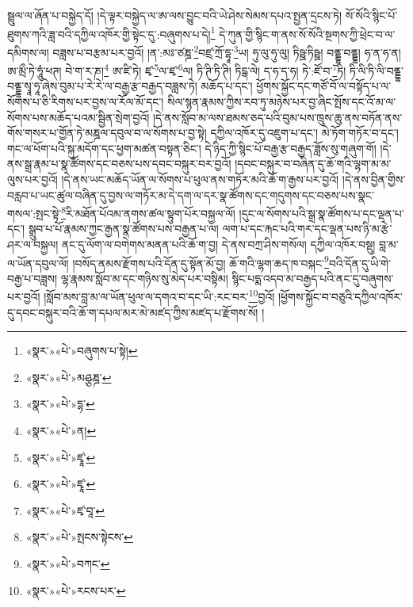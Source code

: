 སྦྲུལ་ལ་ཞོན་པ་བསྐྱེད་དོ། །དེ་ལྟར་བསྐྱེད་ལ་ཨ་ལས་བྱུང་བའི་ཡེ་ཤེས་སེམས་དཔའ་སྤྱན་དྲངས་ཏེ། སོ་སོའི་སྙིང་པོ་ཐུགས་ཀའི་ཟླ་བའི་དཀྱིལ་འཁོར་གྱི་སྟེང་དུ་:བཞུགས་པ་དེ།\footnote{«སྣར་»«པེ་»བཞུགས་པ་སྟེ།} དེ་ཀུན་གྱི་སྙིང་ག་ནས་སོ་སོའི་སྔགས་ཀྱི་ཕྲེང་བ་ལ་དམིགས་ལ། བཟླས་པ་བརྩམ་པར་བྱའོ། །ན་:མཿ་ཙཎྜ་\footnote{«སྣར་»«པེ་»མཤྩཎྜ་}བཛྲ་ཀྲོ་དྷཱ་\footnote{«སྣར་»«པེ་»དྷ་}ཡ། ཧུ་ལུ་ཧུ་ལུ། ཏིཥྛ་ཏིཥྛ། བནྡྷ་བནྡྷ། ཧ་ན་ཧ་ན། ཨ་མྲྀ་ཏེ་ཧཱུཾ་ཕཊ། བེ་ག་ར་ཎ།\footnote{«སྣར་»«པེ་»ན།} ཨ་ཛི་ཏེ། ཛྭ་\footnote{«སྣར་»«པེ་»ཛྭཱ་}ལ་ཛྭ་\footnote{«སྣར་»«པེ་»ཛྭཱ་}ལ། ཏི་ཊི་ཏི་ཊི། ཏིངྒ་ལེ། ད་ཧ་ད་ཧ། ཏེ་:ཛོ་བ་\footnote{«སྣར་»«པེ་»ཛྭ་བཱ་}ཏི། ཏི་ལི་ཏི་ལི་བནྡྷ་བནྡྷ་སྭཱ་ཧཱ་ཞེས་བུམ་པ་རེ་རེ་ལ་བརྒྱ་རྩ་བརྒྱད་བཟླས་ཏེ། མཆོད་པ་དང་། ཕྱོགས་སྐྱོང་དང་གཙོ་བོ་ལ་བསྟོད་པ་ལ་སོགས་པ་ཅི་རིགས་པར་བྱས་ལ་རོལ་མོ་དང་། སིལ་སྙན་རྣམས་ཀྱིས་རབ་ཏུ་མཉེས་པར་བྱ་ཞིང་སྤོས་དང་འོ་མ་ལ་སོགས་པས་མཆོད་པའམ་སྦྱིན་སྲེག་བྱའོ། །དེ་ནས་སློབ་མ་ལས་ཐམས་ཅད་པའི་བུམ་པས་ཁྲུས་ཆུ་ནས་བཏོན་ནས་གོས་གསར་པ་གྱོན་ཏེ་མཎྜལ་དབུལ་བ་ལ་སོགས་པ་བྱ་སྟེ། དཀྱིལ་འཁོར་དུ་འཇུག་པ་དང་། མེ་ཏོག་གཏོར་བ་དང་། གང་ལ་ཕོག་པའི་སྐུ་མདོག་དང་ཕྱག་མཚན་བསྟན་ཅིང་། དེ་ཉིད་ཀྱི་སྙིང་པོ་བརྒྱ་རྩ་བརྒྱད་ཟློས་སུ་གཞུག་གོ། །དེ་ནས་སྒྲ་རྣམ་པ་སྣ་ཚོགས་དང་བཅས་པས་དབང་བསྐུར་བར་བྱའོ། །དབང་བསྐུར་བ་བཞིན་དུ་ཆོ་གའི་ལྷག་མ་མ་ལུས་པར་བྱའོ། །དེ་ནས་ཡང་མཆོད་ཡོན་ལ་སོགས་པ་ཕུལ་ནས་གཏོར་མའི་ཆོ་ག་རྒྱས་པར་བྱའོ། །དེ་ནས་བྱིན་གྱིས་བརླབ་པ་ཡང་ཚུལ་བཞིན་དུ་བྱས་ལ་གཏོར་མ་དེ་དག་ལ་དར་སྣ་ཚོགས་དང་གདུགས་དང་བཅས་པས་སྣང་གསལ་:སྤང་སྟེ་\footnote{«སྣར་»«པེ་»སྤངས་སྟེངས་}རི་མཐོན་པོའམ་ནགས་ཚལ་སྟུག་པོར་བསྐྱལ་ལོ། །དུང་ལ་སོགས་པའི་སྒྲ་སྣ་ཚོགས་པ་དང་ལྡན་པ་དང་། སྒྲུབ་པ་པོ་རྣམས་ཀྱང་རྒྱན་སྣ་ཚོགས་པས་བརྒྱན་པ་ལ། ལག་པ་དང་རྐང་པའི་གར་དང་ལྡན་པས་ཉི་མ་རྩེ་ཤར་ལ་བསྐྱལ། ནང་དུ་ལོག་ལ་བགེགས་མནན་པའི་ཆོ་ག་བྱ། དེ་ནས་བཀྲ་ཤིས་གསོལ། དཀྱིལ་འཁོར་བསྡུ། བླ་མ་ལ་ཡོན་དབུལ་ལོ། །བསོད་ནམས་རྫོགས་པའི་དོན་དུ་སྟོན་མོ་བྱ། ཆོ་གའི་ལྷག་ཆད་ཁ་བསྐང་\footnote{«སྣར་»«པེ་»བཀང་}བའི་དོན་དུ་ཡི་གེ་བརྒྱ་པ་བཟླས། ལྷ་རྣམས་སློབ་མ་དང་གཉིས་སུ་མེད་པར་བསྟིམ། སྙིང་པདྨ་འདབ་མ་བརྒྱད་པའི་ནང་དུ་བཞུགས་པར་བྱའོ། །སློབ་མས་བླ་མ་ལ་ཡོན་ཕུལ་ལ་དགའ་བ་དང་ཡི་:རང་བར་\footnote{«སྣར་»«པེ་»རངས་པར་}བྱའོ། །ཕྱོགས་སྐྱོང་བ་བཅུའི་དཀྱིལ་འཁོར་དུ་དབང་བསྐུར་བའི་ཆོ་ག་དཔལ་མར་མེ་མཛད་ཀྱིས་མཛད་པ་རྫོགས་སོ། ། 